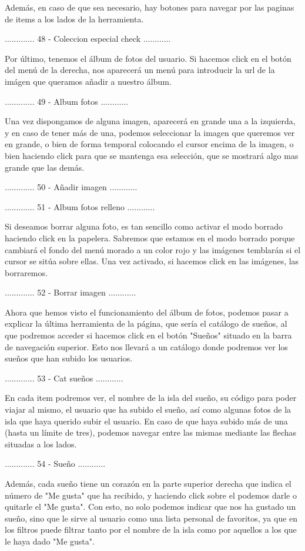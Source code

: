 Además, en caso de que sea necesario, hay botones para navegar por las paginas de items a los lados
de la herramienta.

............. 48 - Coleccion especial check ............

Por último, tenemos el álbum de fotos del usuario. Si hacemos click en el botón del menú de la derecha,
nos aparecerá un menú para introducir la url de la imágen que queramos añadir a nuestro álbum.

............. 49 - Album fotos ............

Una vez dispongamos de alguna imagen, aparecerá en grande una a la izquierda, y en caso de tener
más de una, podemos seleccionar la imagen que queremos ver en grande, o bien de forma temporal colocando
el cursor encima de la imagen, o bien haciendo click para que se mantenga esa selección, que se mostrará
algo mas grande que las demás.

............. 50 - Añadir imagen ............

............. 51 - Album fotos relleno ............

Si deseamos borrar alguna foto, es tan sencillo como activar el modo borrado haciendo click en la
papelera. Sabremos que estamos en el modo borrado porque cambiará el fondo del menú morado a un color
rojo y las imágenes temblarán si el cursor se sitúa sobre ellas. Una vez activado, si hacemos click 
en las imágenes, las borraremos.

............. 52 - Borrar imagen ............

Ahora que hemos visto el funcionamiento del álbum de fotos, podemos pasar a explicar la última herramienta
de la página, que sería el catálogo de sueños, al que podremos acceder si hacemos click en el botón
"Sueños" situado en la barra de navegación superior. Esto nos llevará a un catálogo donde podremos ver
los sueños que han subido los usuarios.

............. 53 - Cat sueños ............

En cada item podremos ver, el nombre de la isla del sueño, su código para poder viajar al mismo,
el usuario que ha subido el sueño, así como algunas fotos de la isla que haya querido subir
el usuario. En caso de que haya subido más de una (hasta un límite de tres), podemos navegar
entre las mismas mediante las flechas situadas a los lados.

............. 54 - Sueño ............

Además, cada sueño tiene un corazón en la parte superior derecha que indica el número de
"Me gusta" que ha recibido, y haciendo click sobre el podemos darle o quitarle el "Me gusta".
Con esto, no solo podemos indicar que nos ha gustado un sueño, sino que le sirve al usuario
como una lista personal de favoritos, ya que en los filtros puede filtrar tanto por el nombre
de la isla como por aquellos a los que le haya dado "Me gusta".

